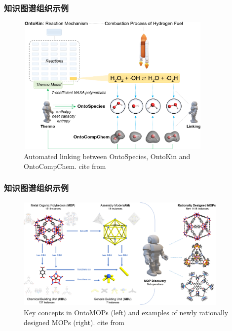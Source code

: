 \frame
{
	\frametitle{知识图谱组织示例}
\begin{figure}[h!]
\centering
\vskip -8pt
\includegraphics[height=2.70in,width=3.75in,viewport=0 0 1010 750,clip]{Figures/Automated-linking-between-OntoSepcies-Kin-CompChem.png}
\caption{\tiny\textrm{Automated linking between OntoSpecies, OntoKin and OntoCompChem. cite from\cite{ACR56-128_2023}}}%
\label{Fig:Automated-linking-between-OntoSpecies-Kin-CompChem}
\end{figure}
}

\frame
{
	\frametitle{知识图谱组织示例}
\begin{figure}[h!]
\centering
\vskip -8pt
\includegraphics[height=2.20in,width=4.05in,viewport=0 0 1330 700,clip]{Figures/Key_concepts-in-OntoMOPs-and-designed-MOPs.png}
\caption{\tiny\textrm{Key concepts in OntoMOPs (left) and examples of newly rationally designed MOPs (right). cite from\cite{ACR56-128_2023}}}%
\label{Fig:OntoMOPs-MOPs}
\end{figure}
}

